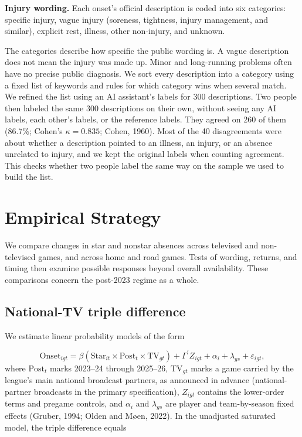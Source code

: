 \documentclass[11pt]{article}
\begin{document}
\noindent\textbf{Injury wording.} Each onset's official description is coded into six categories: specific injury, vague injury (soreness, tightness, injury management, and similar), explicit rest, illness, other non-injury, and unknown.

The categories describe how specific the public wording is. A vague description does not mean the injury was made up. Minor and long-running problems often have no precise public diagnosis. We sort every description into a category using a fixed list of keywords and rules for which category wins when several match. We refined the list using an AI assistant’s labels for 300 descriptions. Two people then labeled the same 300 descriptions on their own, without seeing any AI labels, each other’s labels, or the reference labels. They agreed on 260 of them (86.7\%; Cohen’s $\kappa = 0.835$; Cohen, 1960). Most of the 40 disagreements were about whether a description pointed to an illness, an injury, or an absence unrelated to injury, and we kept the original labels when counting agreement. This checks whether two people label the same way on the sample we used to build the list.

\section{Empirical Strategy}\label{sec:strategy}

We compare changes in star and nonstar absences across televised and non-televised games, and across home and road games. Tests of wording, returns, and timing then examine possible responses beyond overall availability. These comparisons concern the post-2023 regime as a whole.

\subsection{National-TV triple difference}

We estimate linear probability models of the form

\[\mathrm{Onset}_{igt}=\beta(\mathrm{Star}_{it}\times\mathrm{Post}_{t}\times\mathrm{TV}_{gt})+\Gamma^{\prime}Z_{igt}+\alpha_i+\lambda_{gs}+\varepsilon_{igt},\]
where $\mathrm{Post}_t$ marks 2023--24 through 2025--26, $\mathrm{TV}_{gt}$ marks a game carried by the league's main national broadcast partners, as announced in advance (national-partner broadcasts in the primary specification), $Z_{igt}$ contains the lower-order terms and pregame controls, and $\alpha_i$ and $\lambda_{gs}$ are player and team-by-season fixed effects (Gruber, 1994; Olden and M\o{}en, 2022). In the unadjusted saturated model, the triple difference equals
\end{document}
